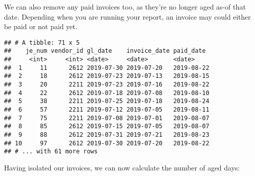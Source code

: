 \documentclass[
]{book}
\newenvironment{Shaded}{\begin{snugshade}}{\end{snugshade}}
\newcommand{\CommentTok}[1]{\textcolor[rgb]{0.56,0.35,0.01}{\textit{#1}}}
\newcommand{\KeywordTok}[1]{\textcolor[rgb]{0.13,0.29,0.53}{\textbf{#1}}}
\newcommand{\NormalTok}[1]{#1}
\newcommand{\OperatorTok}[1]{\textcolor[rgb]{0.81,0.36,0.00}{\textbf{#1}}}
\newcommand{\StringTok}[1]{\textcolor[rgb]{0.31,0.60,0.02}{#1}}
\begin{document}
We can also remove any paid invoices too, as they're no longer aged as-of that date. Depending when you are running your report, an invoice may could either be paid or not paid yet.

\begin{Shaded}
\end{Shaded}

\begin{verbatim}
## # A tibble: 71 x 5
##    je_num vendor_id gl_date    invoice_date paid_date 
##     <int>     <int> <date>     <date>       <date>    
##  1     11      2612 2019-07-30 2019-07-20   2019-08-22
##  2     18      2612 2019-07-23 2019-07-13   2019-08-15
##  3     20      2211 2019-07-23 2019-07-16   2019-08-22
##  4     22      2612 2019-07-18 2019-07-08   2019-08-10
##  5     38      2211 2019-07-25 2019-07-18   2019-08-24
##  6     57      2211 2019-07-12 2019-07-05   2019-08-11
##  7     75      2211 2019-07-08 2019-07-01   2019-08-07
##  8     85      2612 2019-07-15 2019-07-05   2019-08-07
##  9     88      2612 2019-07-31 2019-07-21   2019-08-23
## 10     97      2612 2019-07-30 2019-07-20   2019-08-22
## # ... with 61 more rows
\end{verbatim}

Having isolated our invoices, we can now calculate the number of aged days:
\end{document}
